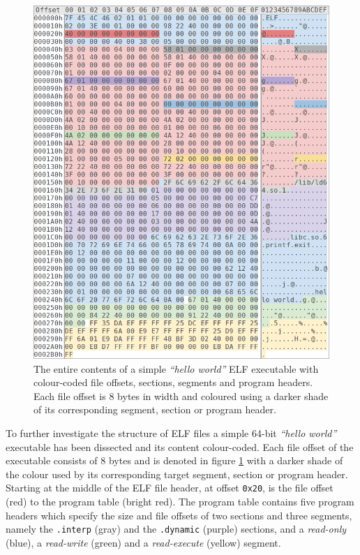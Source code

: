 \begin{figure}[htbp]
	\begin{center}
		\includegraphics[width=\textwidth]{inc/elf_dissection.png}
		\caption{The entire contents of a simple \textit{``hello world''} ELF executable with colour-coded file offsets, sections, segments and program headers. Each file offset is 8 bytes in width and coloured using a darker shade of its corresponding segment, section or program header.}
		\label{fig:elf_dissection}
	\end{center}
\end{figure}

To further investigate the structure of ELF files a simple 64-bit \textit{``hello world''} executable has been dissected and its content colour-coded. Each file offset of the executable consists of 8 bytes and is denoted in figure \ref{fig:elf_dissection} with a darker shade of the colour used by its corresponding target segment, section or program header. Starting at the middle of the ELF file header, at offset \texttt{0x20}, is the file offset (red) to the program table (bright red). The program table contains five program headers which specify the size and file offsets of two sections and three segments, namely the \texttt{.interp} (gray) and the \texttt{.dynamic} (purple) sections, and a \textit{read-only} (blue), a \textit{read-write} (green) and a \textit{read-execute} (yellow) segment.

